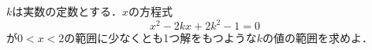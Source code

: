 \documentclass[8pt,dvipdfmx]{article}
\begin{document}
\begin{tcolorbox}[title=数学\textcircled{1} 2- 7 C ]
\(k\)は実数の定数とする．\(x\)の方程式
\[x^2 -2kx +2k^2 -1 =0\]
が$0<x<2$の範囲に少なくとも1つ解をもつような$k$の値の範囲を求めよ．
\end{tcolorbox}



\end{document}
